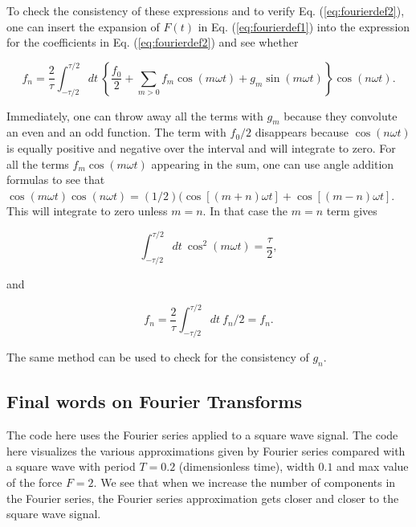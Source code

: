 \documentclass[%
oneside,                 %
final,                   %
10pt]{article}
\begin{document}
To check the consistency of these expressions and to verify
Eq. (\ref{eq:fourierdef2}), one can insert the expansion of $F(t)$ in
Eq. (\ref{eq:fourierdef1}) into the expression for the coefficients in
Eq. (\ref{eq:fourierdef2}) and see whether

\[
f_n=\frac{2}{\tau}\int_{-\tau/2}^{\tau/2} dt~\left\{\frac{f_0}{2}+\sum_{m>0}f_m\cos(m\omega t)+g_m\sin(m\omega t)\right\}\cos(n\omega t).
\]

Immediately, one can throw away all the terms with $g_m$ because they
convolute an even and an odd function. The term with $f_0/2$
disappears because $\cos(n\omega t)$ is equally positive and negative
over the interval and will integrate to zero. For all the terms
$f_m\cos(m\omega t)$ appearing in the sum, one can use angle addition
formulas to see that $\cos(m\omega t)\cos(n\omega
t)=(1/2)(\cos[(m+n)\omega t]+\cos[(m-n)\omega t]$. This will integrate
to zero unless $m=n$. In that case the $m=n$ term gives

\begin{equation}
\int_{-\tau/2}^{\tau/2}dt~\cos^2(m\omega t)=\frac{\tau}{2},
\end{equation}

and

\[
f_n=\frac{2}{\tau}\int_{-\tau/2}^{\tau/2} dt~f_n/2=f_n.
\]

The same method can be used to check for the consistency of $g_n$.

\subsection{Final words on Fourier Transforms}

The code here uses the Fourier series applied to a 
square wave signal. The code here
visualizes the various approximations given by Fourier series compared
with a square wave with period $T=0.2$ (dimensionless time), width $0.1$ and max value of the force $F=2$. We
see that when we increase the number of components in the Fourier
series, the Fourier series approximation gets closer and closer to the
square wave signal.
\end{document}
